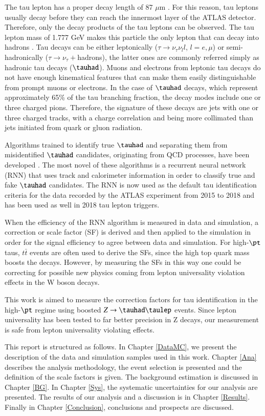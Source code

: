 The tau lepton has a proper decay length of 87 $\mu$m \cite{PhysRevD.98.030001}. For this reason, tau leptons usually decay before they can reach the innermost layer of the ATLAS detector. Therefore, only the decay products of the tau leptons can be observed. The tau lepton mass of 1.777 GeV makes this particle the only lepton that can decay into hadrons \cite{PhysRevD.98.030001}. Tau decays can be either leptonically ($\tau\to\nu_\tau\nu_l l$, $l=e,\mu$) or semi-hadronically ($\tau\to\nu_\tau+$hadrons), the latter ones are commonly referred simply as hadronic tau decays ($\tauhad$). Muons and electrons from leptonic tau decays do not have enough kinematical features that can make them easily distinguishable from prompt muons or electrons. In the case of $\tauhad$ decays, which represent approximately 65\% of the tau branching fraction, the decay modes include one or three charged pions. Therefore, the signature of these decays are jets with one or three charged tracks, with a charge correlation and being more collimated than jets initiated from quark or gluon radiation.

Algorithms trained to identify true $\tauhad$ and separating them from misidentified $\tauhad$  candidates, originating from QCD processes, have been developed \cite{Deutsch:2680523}. The most novel of these algorithms is a recurrent neural network (RNN) that uses track and calorimeter information in order to classify true and fake $\tauhad$ candidates. The RNN is now used as the default tau identification criteria for the data recorded by the ATLAS experiment from 2015 to 2018 and has been used as well in 2018 tau lepton triggers.

When the efficiency of the RNN algorithm is measured in data and simulation, a correction or scale factor (SF) is derived and then applied to the simulation in order for the signal efficiency to agree between data and simulation. For high-$\pt$ taus, $t\bar{t}$ events are often used to derive the SFs, since the high top quark mass boosts the decays. However, by measuring the SFs in this way one could be correcting for possible new physics coming from lepton universality violation effects in the W boson decays.

This work is aimed to measure the correction factors for tau identification in the high-$\pt$ regime using boosted $Z\to\tauhad\taulep$ events. Since lepton universality has been tested to far better precision in Z decays, our measurement is safe from lepton universality violating effects.

This report is structured as follows. In Chapter \ref{DataMC}, we present the description of the data and simulation samples used in this work. Chapter \ref{Ana}  describes the analysis methodology, the event selection is presented and the definition of the scale factors is given. The background estimation is discussed in Chapter \ref{BG}. In Chapter \ref{Sys}, the systematic uncertainties for our analysis are presented. The results of our analysis and a discussion is in Chapter \ref{Results}. Finally in Chapter \ref{Conclusion}, conclusions and prospects are discussed.
